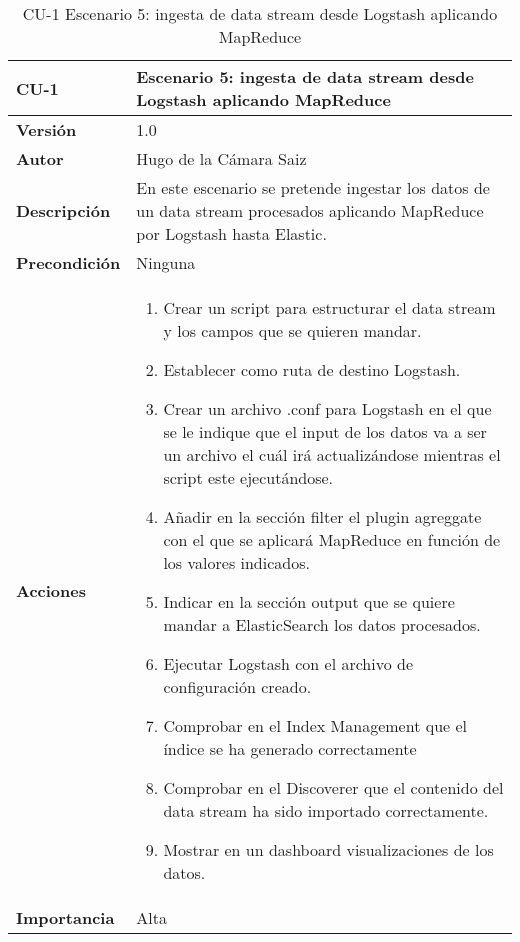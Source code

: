 \begin{table}[p]
	\centering
	\begin{tabularx}{\linewidth}{ p{} p{} }
		\toprule
		\textbf{CU-1}    & \textbf{Escenario 5: ingesta de data stream desde Logstash aplicando MapReduce}\\
		\toprule
		\textbf{Versión}              & 1.0    \\
		\textbf{Autor}                & Hugo de la Cámara Saiz \\
		\textbf{Descripción}          & En este escenario se pretende ingestar los datos de un data stream procesados aplicando MapReduce por Logstash hasta Elastic. \\
		\textbf{Precondición}         & Ninguna  \\
		\textbf{Acciones}             &
		\begin{enumerate}
			\def\labelenumi{\arabic{enumi}.}
			\tightlist
			\item Crear un script para estructurar el data stream y los campos que se quieren mandar.
                \item Establecer como ruta de destino Logstash.
                \item Crear un archivo .conf para Logstash en el que se le indique que el input de los datos va a ser un archivo el cuál irá actualizándose mientras el script este ejecutándose.
                \item Añadir en la sección filter el plugin agreggate con el que se aplicará MapReduce en función de los valores indicados.
                \item Indicar en la sección output que se quiere mandar a ElasticSearch los datos procesados.
                \item Ejecutar Logstash con el archivo de configuración creado.
                \item Comprobar en el Index Management que el índice se ha generado correctamente
			\item Comprobar en el Discoverer que el contenido del data stream ha sido importado correctamente.
                \item Mostrar en un dashboard visualizaciones de los datos.
		\end{enumerate}\\
		\textbf{Importancia}          & Alta \\
		\bottomrule
	\end{tabularx}
	\caption{CU-1 Escenario 5: ingesta de data stream desde Logstash aplicando MapReduce}
\end{table}